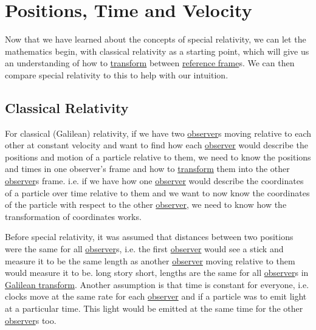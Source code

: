 \chapter{Positions, Time and Velocity} %

Now that we have learned about the concepts of special relativity, we can let the mathematics begin, with classical relativity as a starting point, which will give us an understanding of how to \hyperlink{def-transform}{transform} between \hyperlink{def-Reference-frame}{reference frame}s.
We can then compare special relativity to this to help with our intuition.

\section{Classical Relativity}

For classical (Galilean) relativity, if we have two \hyperlink{def-observer}{observer}s moving relative to each other at constant velocity and want to find how each \hyperlink{def-observer}{observer} would describe the positions and motion of a particle relative to them, we need to know the positions and times in one observer's frame and how to \hyperlink{def-transform}{transform} them into the other \hyperlink{def-observer}{observer}s frame.
i.e.
if we have how one \hyperlink{def-observer}{observer} would describe the coordinates of a particle over time relative to them and we want to now know the coordinates of the particle with respect to the other \hyperlink{def-observer}{observer}, we need to know how the transformation of coordinates works.

Before special relativity, it was assumed that distances between two positions were the same for all \hyperlink{def-observer}{observer}s, i.e.
the first \hyperlink{def-observer}{observer} would see a stick and measure it to be the same length as another \hyperlink{def-observer}{observer} moving relative to them would measure it to be.
long story short, lengths are the same for all \hyperlink{def-observer}{observer}s in \hyperlink{def-galilean-transform}{Galilean transform}.
Another assumption is that time is constant for everyone, i.e.
clocks move at the same rate for each \hyperlink{def-observer}{observer} and if a particle was to emit light at a particular time.
This light would be emitted at the same time for the other \hyperlink{def-observer}{observer}s too.

